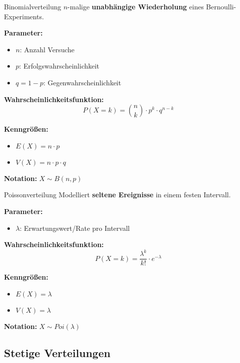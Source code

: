 \begin{definition}{Binomialverteilung}
$n$-malige \textbf{unabhängige Wiederholung} eines Bernoulli-Experiments.

\textbf{Parameter:}
\begin{itemize}
    \item $n$: Anzahl Versuche
    \item $p$: Erfolgswahrscheinlichkeit
    \item $q = 1-p$: Gegenwahrscheinlichkeit
\end{itemize}

\textbf{Wahrscheinlichkeitsfunktion:}
$$P(X=k) = \binom{n}{k} \cdot p^k \cdot q^{n-k}$$

\textbf{Kenngrößen:}
\begin{itemize}
    \item $E(X) = n \cdot p$
    \item $V(X) = n \cdot p \cdot q$
\end{itemize}

\textbf{Notation:} $X \sim B(n,p)$
\end{definition}

\begin{definition}{Poissonverteilung}
Modelliert \textbf{seltene Ereignisse} in einem festen Intervall.

\textbf{Parameter:}
\begin{itemize}
    \item $\lambda$: Erwartungswert/Rate pro Intervall
\end{itemize}

\textbf{Wahrscheinlichkeitsfunktion:}
$$P(X=k) = \frac{\lambda^k}{k!} \cdot e^{-\lambda}$$

\textbf{Kenngrößen:}
\begin{itemize}
    \item $E(X) = \lambda$
    \item $V(X) = \lambda$
\end{itemize}

\textbf{Notation:} $X \sim Poi(\lambda)$
\end{definition}

\subsection{Stetige Verteilungen}

